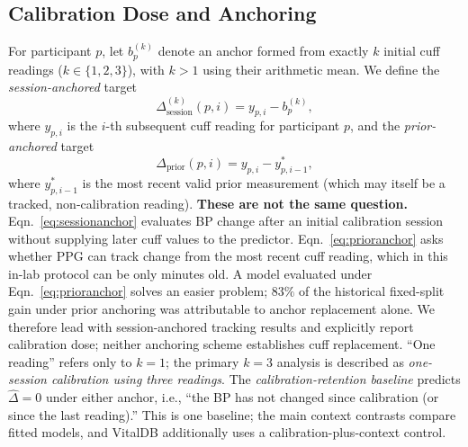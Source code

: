 \documentclass[journal]{IEEEtran}
\begin{document}
\subsection{Calibration Dose and Anchoring}
\label{sec:anchoring}
For participant $p$, let $b_p^{(k)}$ denote an anchor formed from exactly $k$ initial cuff readings ($k\in\{1,2,3\}$), with $k>1$ using their arithmetic mean. We define the \emph{session-anchored} target
\begin{equation}
\Delta_{\mathrm{session}}^{(k)}(p,i) = y_{p,i} - b_p^{(k)},
\label{eq:sessionanchor}
\end{equation}
where $y_{p,i}$ is the $i$-th subsequent cuff reading for participant $p$, and the \emph{prior-anchored} target
\begin{equation}
\Delta_{\mathrm{prior}}(p,i) = y_{p,i} - y_{p,i-1}^{*},
\label{eq:prioranchor}
\end{equation}
where $y_{p,i-1}^{*}$ is the most recent valid prior measurement (which may itself be a tracked, non-calibration reading). \textbf{These are not the same question.} Eqn.~\ref{eq:sessionanchor} evaluates BP change after an initial calibration session without supplying later cuff values to the predictor. Eqn.~\ref{eq:prioranchor} asks whether PPG can track change from the most recent cuff reading, which in this in-lab protocol can be only minutes old. A model evaluated under Eqn.~\ref{eq:prioranchor} solves an easier problem; $83\%$ of the historical fixed-split gain under prior anchoring was attributable to anchor replacement alone. We therefore lead with session-anchored tracking results and explicitly report calibration dose; neither anchoring scheme establishes cuff replacement. ``One reading'' refers only to $k=1$; the primary $k=3$ analysis is described as \emph{one-session calibration using three readings}.
The \emph{calibration-retention baseline} predicts $\hat{\Delta} = 0$ under either anchor, i.e., ``the BP has not changed since calibration (or since the last reading).'' This is one baseline; the main context contrasts compare fitted models, and VitalDB additionally uses a calibration-plus-context control.
\end{document}
